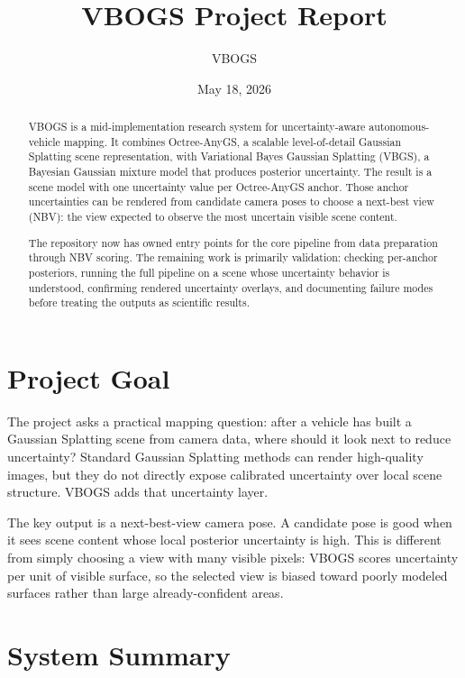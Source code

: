 \documentclass[11pt]{article}
\title{VBOGS Project Report}
\author{VBOGS}
\date{May 18, 2026}
\begin{document}
\maketitle

\begin{abstract}
VBOGS is a mid-implementation research system for uncertainty-aware
autonomous-vehicle mapping. It combines Octree-AnyGS, a scalable
level-of-detail Gaussian Splatting scene representation, with Variational
Bayes Gaussian Splatting (VBGS), a Bayesian Gaussian mixture model that
produces posterior uncertainty. The result is a scene model with one
uncertainty value per Octree-AnyGS anchor. Those anchor uncertainties can be
rendered from candidate camera poses to choose a next-best view (NBV): the
view expected to observe the most uncertain visible scene content.

The repository now has owned entry points for the core pipeline from data
preparation through NBV scoring. The remaining work is primarily validation:
checking per-anchor posteriors, running the full pipeline on a scene whose
uncertainty behavior is understood, confirming rendered uncertainty overlays,
and documenting failure modes before treating the outputs as scientific
results.
\end{abstract}

\tableofcontents
\newpage

\section{Project Goal}

The project asks a practical mapping question: after a vehicle has built a
Gaussian Splatting scene from camera data, where should it look next to reduce
uncertainty? Standard Gaussian Splatting methods can render high-quality
images, but they do not directly expose calibrated uncertainty over local
scene structure. VBOGS adds that uncertainty layer.

The key output is a next-best-view camera pose. A candidate pose is good when
it sees scene content whose local posterior uncertainty is high. This is
different from simply choosing a view with many visible pixels: VBOGS scores
uncertainty per unit of visible surface, so the selected view is biased toward
poorly modeled surfaces rather than large already-confident areas.

\section{System Summary}
\end{document}
